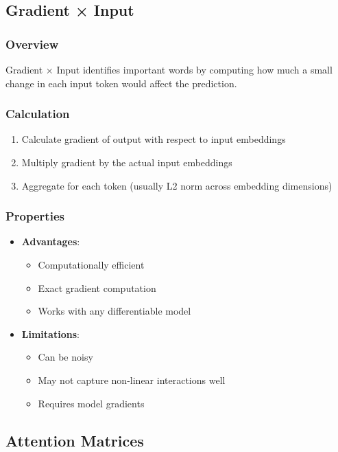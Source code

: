 \documentclass{article}
\begin{document}
\subsection{Gradient × Input}

\subsubsection{Overview}
Gradient × Input identifies important words by computing how much a small change in each input token would affect the prediction.

\subsubsection{Calculation}
\begin{enumerate}
    \item Calculate gradient of output with respect to input embeddings
    \item Multiply gradient by the actual input embeddings
    \item Aggregate for each token (usually L2 norm across embedding dimensions)
\end{enumerate}

\subsubsection{Properties}
\begin{itemize}
    \item \textbf{Advantages}:
        \begin{itemize}
            \item Computationally efficient
            \item Exact gradient computation
            \item Works with any differentiable model
        \end{itemize}
    \item \textbf{Limitations}:
        \begin{itemize}
            \item Can be noisy
            \item May not capture non-linear interactions well
            \item Requires model gradients
        \end{itemize}
\end{itemize}

\subsection{Attention Matrices}
\end{document}
